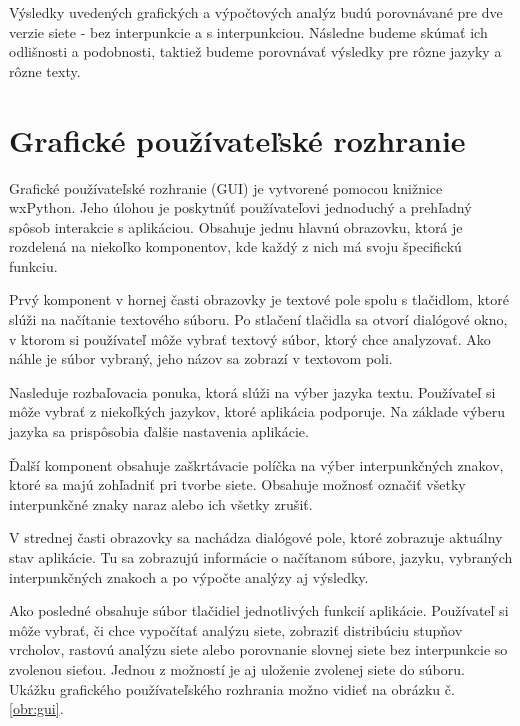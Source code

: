 Výsledky uvedených grafických a výpočtových analýz budú porovnávané pre dve verzie siete - bez interpunkcie a s interpunkciou. Následne
budeme skúmať ich odlišnosti a podobnosti, taktiež budeme porovnávať výsledky pre rôzne jazyky a rôzne texty.

\section{Grafické používateľské rozhranie}\label{sec:GUI}

Grafické používateľské rozhranie (GUI) je vytvorené pomocou knižnice wxPython. Jeho úlohou je poskytnúť používateľovi
jednoduchý a prehľadný spôsob interakcie s aplikáciou. Obsahuje jednu hlavnú obrazovku, ktorá je rozdelená na niekoľko komponentov,
kde každý z nich má svoju špecifickú funkciu.

Prvý komponent v hornej časti obrazovky je textové pole spolu s tlačidlom, ktoré slúži na načítanie textového súboru.
Po stlačení tlačidla sa otvorí dialógové okno, v ktorom si používateľ môže vybrať textový súbor, ktorý chce analyzovať.
Ako náhle je súbor vybraný, jeho názov sa zobrazí v textovom poli.

Nasleduje rozbaľovacia ponuka, ktorá slúži na výber jazyka textu. Používateľ si môže vybrať z niekoľkých jazykov,
ktoré aplikácia podporuje. Na základe výberu jazyka sa prispôsobia ďalšie nastavenia aplikácie.

Ďalší komponent obsahuje zaškrtávacie políčka na výber interpunkčných znakov, ktoré sa majú
zohľadniť pri tvorbe siete. Obsahuje možnosť označiť všetky interpunkčné znaky naraz alebo ich všetky zrušiť.

V strednej časti obrazovky sa nachádza dialógové pole, ktoré zobrazuje aktuálny stav aplikácie. Tu sa zobrazujú informácie o načítanom súbore,
jazyku, vybraných interpunkčných znakoch a po výpočte analýzy aj výsledky.

Ako posledné obsahuje súbor tlačidiel jednotlivých funkcií aplikácie. Používateľ si môže vybrať, či chce vypočítať analýzu siete,
zobraziť distribúciu stupňov vrcholov, rastovú analýzu siete alebo porovnanie slovnej siete bez interpunkcie so zvolenou sieťou.
Jednou z možností je aj uloženie zvolenej siete do súboru.
Ukážku grafického používateľského rozhrania možno vidieť na obrázku č. \ref{obr:gui}.


